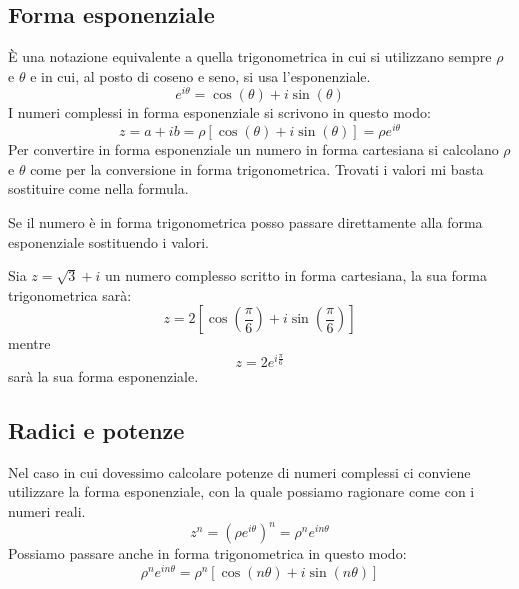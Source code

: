 \subsection{Forma esponenziale}
\`E una notazione equivalente a quella trigonometrica in cui si utilizzano sempre $\rho$ e
$\theta$ e in cui, al posto di coseno e seno, si usa l'esponenziale.
\begin{equation*}
	e^{i \theta } = \cos{(\theta)} + i \sin{(\theta)}
\end{equation*}
I numeri complessi in forma esponenziale si scrivono in questo modo:
\begin{equation*}
	z = a + ib = \rho [\cos{(\theta)} + i \sin{(\theta)}] = \rho e^{i \theta }
\end{equation*}
Per convertire in forma esponenziale un numero in forma cartesiana si calcolano $\rho$ e
$\theta$ come per la conversione in forma trigonometrica. Trovati i valori mi basta sostituire
come nella formula.

Se il numero \`e in forma trigonometrica posso passare direttamente alla forma
esponenziale sostituendo i valori.

\begin{example}
	Sia $z = \sqrt{3} + i$ un numero complesso scritto in forma cartesiana, la sua forma
	trigonometrica sar\`a:
	\begin{equation*}
		z = 2 \left[ \cos{\left( \frac{\pi}{6} \right)} +
			i \sin{\left( \frac{\pi}{6} \right)} \right]
	\end{equation*}
	mentre
	\begin{equation*}
		z = 2 e^{i \frac{\pi}{6}}
	\end{equation*}
	sar\`a la sua forma esponenziale.
\end{example}

\subsection{Radici e potenze}
Nel caso in cui dovessimo calcolare potenze di numeri complessi ci conviene utilizzare la
forma esponenziale, con la quale possiamo ragionare come con i numeri reali.
\begin{equation*}
	z^n = (\rho e^{i \theta})^n = \rho^n e^{i n \theta}
\end{equation*}
Possiamo passare anche in forma trigonometrica in questo modo:
\begin{equation*}
	\rho^n e^{i n \theta} = \rho^n [\cos{(n \theta)} + i \sin{(n \theta)}]
\end{equation*}

